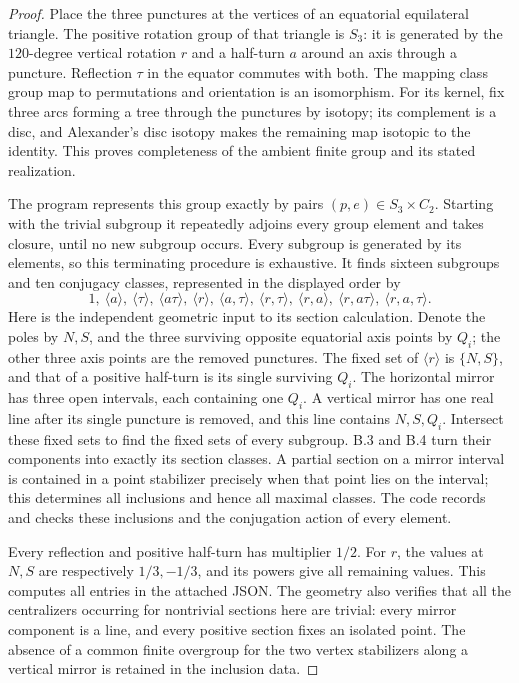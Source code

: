 \begin{proof}
Place the three punctures at the vertices of an equatorial equilateral triangle.
The positive rotation group of that triangle is $S_3$: it is generated by the
$120$-degree vertical rotation $r$ and a half-turn $a$ around an axis through a
puncture. Reflection $\tau$ in the equator commutes with both. The mapping class
group map to permutations and orientation is an isomorphism. For its kernel,
fix three arcs forming a tree through the punctures by isotopy; its complement
is a disc, and Alexander's disc isotopy makes the remaining map isotopic to the
identity. This proves completeness of the ambient finite group and its stated
realization.

The program represents this group exactly by pairs $(p,e)\in S_3\times C_2$.
Starting with the trivial subgroup it repeatedly adjoins every group element
and takes closure, until no new subgroup occurs. Every subgroup is generated
by its elements, so this terminating procedure is exhaustive. It finds sixteen
subgroups and ten conjugacy classes, represented in the displayed order by
\[
 1,\ \langle a\rangle,\ \langle\tau\rangle,\
 \langle a\tau\rangle,\ \langle r\rangle,\ \langle a,\tau\rangle,\
 \langle r,\tau\rangle,\ \langle r,a\rangle,\
 \langle r,a\tau\rangle,\ \langle r,a,\tau\rangle.
\]
Here is the independent geometric input to its section calculation. Denote the
poles by $N,S$, and the three surviving opposite equatorial axis points by
$Q_i$; the other three axis points are the removed punctures. The fixed set of
$\langle r\rangle$ is $\{N,S\}$, and that of a positive half-turn is its single
surviving $Q_i$. The horizontal mirror has three open intervals, each containing
one $Q_i$. A vertical mirror has one real line after its single puncture is
removed, and this line contains $N,S,Q_i$. Intersect these fixed sets to find the
fixed sets of every subgroup. B.3 and B.4 turn their components into exactly
its section classes. A partial section on a mirror interval is contained in a
point stabilizer precisely when that point lies on the interval; this determines
all inclusions and hence all maximal classes. The code records and checks these
inclusions and the conjugation action of every element.

Every reflection and positive half-turn has multiplier $1/2$. For $r$, the
values at $N,S$ are respectively $1/3,-1/3$, and its powers give all remaining
values. This computes all entries in the attached JSON. The geometry also
verifies that all the centralizers occurring for nontrivial sections here are
trivial: every mirror component is a line, and every positive section fixes an
isolated point. The absence of a common finite overgroup for the two vertex
stabilizers along a vertical mirror is retained in the inclusion data.
\end{proof}

